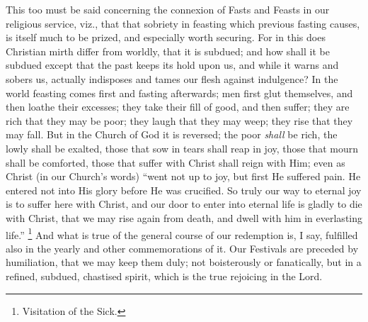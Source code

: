 This too must be said concerning the connexion of Fasts and Feasts
in our religious service, viz., that that sobriety in feasting which
previous fasting causes, is itself much to be prized, and especially
worth securing. For in this does Christian mirth differ from worldly,
that it is subdued; and how shall it be subdued except that the past
keeps its hold upon us, and while it warns and sobers us, actually
indisposes and tames our flesh against indulgence? In the world
feasting comes first and fasting afterwards; men first glut
themselves, and then loathe their excesses; they take their fill of
good, and then suffer; they are rich that they may be poor; they laugh
that they may weep; they rise that they may fall. But in the Church of
God it is reversed; the poor \emph{shall} be rich, the lowly shall be
exalted, those that sow in tears shall reap in joy, those that mourn
shall be comforted, those that suffer with Christ shall reign with
Him; even as Christ (in our Church's words) ``went not up to
joy, but first He suffered pain. He entered not into His glory before
He was crucified. So truly our way to eternal joy is to suffer here
with Christ, and our door to enter into eternal life is gladly to die
with Christ, that we may rise again from death, and dwell with him in
everlasting life.'' \footnote{Visitation of
the Sick.}
And what is true of the general course of our redemption is, I say,
fulfilled also in the yearly and other commemorations of it. Our
Festivals are preceded by humiliation, that we may keep them duly; not
boisterously or fanatically, but in a refined, subdued, chastised
spirit, which is the true rejoicing in the Lord.

